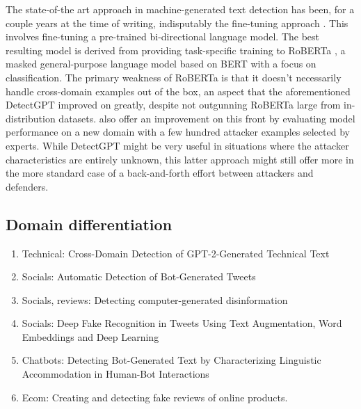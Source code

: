 The state-of-the art approach in machine-generated text detection has been, for a couple years at the time of writing, indisputably the fine-tuning approach \citep{solaiman2019release}.
This involves fine-tuning a pre-trained bi-directional language model.
The best resulting model is derived from providing task-specific training to RoBERTa \citep{liu2019roberta}, a masked general-purpose language model based on BERT \citep{devlin2019bertpretrainingdeepbidirectional} with a focus on classification.
The primary weakness of RoBERTa is that it doesn't necessarily handle cross-domain examples out of the box, an aspect that the aforementioned DetectGPT \citep{mitchell2023detectgpt} improved on greatly, despite not outgunning RoBERTa large from in-distribution datasets.
\citet{rodriguez2022cross} also offer an improvement on this front by evaluating model performance on a new domain with a few hundred attacker examples selected by experts.
While DetectGPT might be very useful in situations where the attacker characteristics are entirely unknown, this latter approach might still offer more in the more standard case of a back-and-forth effort between attackers and defenders.

\subsection{Domain differentiation}

\begin{enumerate}
    \item Technical: Cross-Domain Detection of GPT-2-Generated Technical Text
    \item Socials:  Automatic Detection of Bot-Generated Tweets
    \item Socials, reviews: Detecting computer-generated disinformation
    \item Socials: Deep Fake Recognition in Tweets Using Text Augmentation, Word Embeddings and Deep Learning
    \item Chatbots:  Detecting Bot-Generated Text by Characterizing Linguistic Accommodation in Human-Bot Interactions
    \item Ecom: Creating and detecting fake reviews of online products.
\end{enumerate}